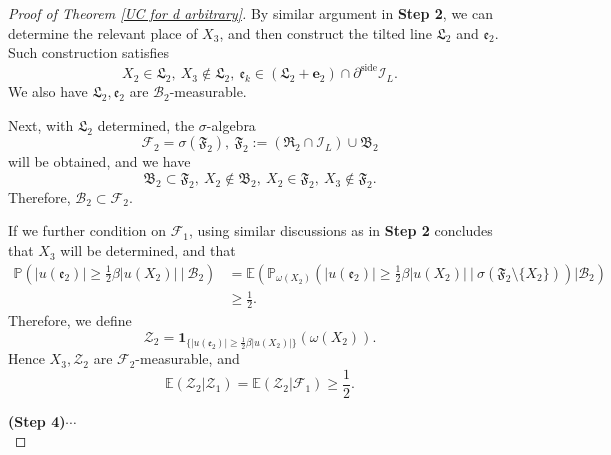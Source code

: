 \documentclass[11pt,reqno,UTF8,twoside]{amsart}
\newcommand{\E}{\mathbb{E}}
\newcommand{\bfe}{\mathbf{e}}
\renewcommand{\P}{\mathbb{P}}
\newcommand{\mcB}{\mathcal{B}}
\newcommand{\mcF}{\mathcal{F}}
\newcommand{\mcI}{\mathcal{I}}
\newcommand{\mcZ}{\mathcal{Z}}
\newcommand{\partialside}{\partial^{\text{side}}}
\theoremstyle{definition}
\numberwithin{equation}{section}
\begin{document}
\begin{proof}[Proof of Theorem \ref{UC for d arbitrary}]
By similar argument in {\bf Step 2}, we can determine the relevant place of $X_3$, and then construct the tilted line $\mathfrak{L}_2$ and $\mathfrak{e}_2$. Such construction satisfies 
\[X_2\in \mathfrak{L}_2,\ X_3\notin {\mathfrak{L}_2},\ \mathfrak{e}_k\in (\mathfrak{L}_2+\bfe_2)\cap \partialside \mcI_L. \]
We also have  {$\mathfrak{L}_2,\mathfrak{e}_2$ are $\mcB_2$-measurable.} 

Next, with $\mathfrak{L}_2$ determined, the $\sigma$-algebra 
\begin{equation}\label{mcF 2}
    \mcF_2=\sigma(\mathfrak{F}_2), \ \mathfrak{F}_2:= (\mathfrak{R}_2\cap \mcI_L )\cup \mathfrak{B}_2 
\end{equation}
will be obtained, and we have 
\begin{equation}\label{2 step relation}
 \mathfrak{B}_2 \subset \mathfrak{F}_2,\   X_2 \notin \mathfrak{B}_2, \   X_2\in \mathfrak{F}_2, \ X_3 \notin \mathfrak{F}_2. 
\end{equation}
{Therefore, $\mcB_2\subset \mcF_2$.} 


If we further condition on $\mcF_1$, using similar discussions  as in {\bf Step 2}  concludes  that $X_3$ will be determined, and that 
\begin{align*}
   \P\left( |u(\mathfrak{e}_2)| \geq \frac{1}{2}\beta |u(X_2)| \ \bigg|   \ \mcB_2 \right)& = \E \left(    \P_{\omega(X_2)}\left( |u(\mathfrak{e}_2)| \geq \frac{1}{2}\beta |u(X_2)| \ \bigg|   \ \sigma(\mathfrak{F}_2 \setminus \{X_2\})  \right)  \bigg| \mcB_2 \right) \\
               &\geq \frac{1}{2}.
\end{align*}
Therefore, we define 
\begin{equation}\label{martingale UC 2}
  \mcZ_2= \mathbf{1}_{\{|u(\mathfrak{e}_2)| \geq \frac{1}{2}\beta |u(X_2)|\} }(\omega(X_2)).
\end{equation}
Hence {$X_3,\mcZ_2$ are $\mcF_2$-measurable,} and 
\begin{equation*}
  \E(\mcZ_2| \mcZ_1)= \E(\mcZ_2 | \mcF_1)\geq \frac{1}{2}.
\end{equation*}


\noindent \textbf{{(Step 4)}}$\cdots$\\


\end{proof}
\end{document}
